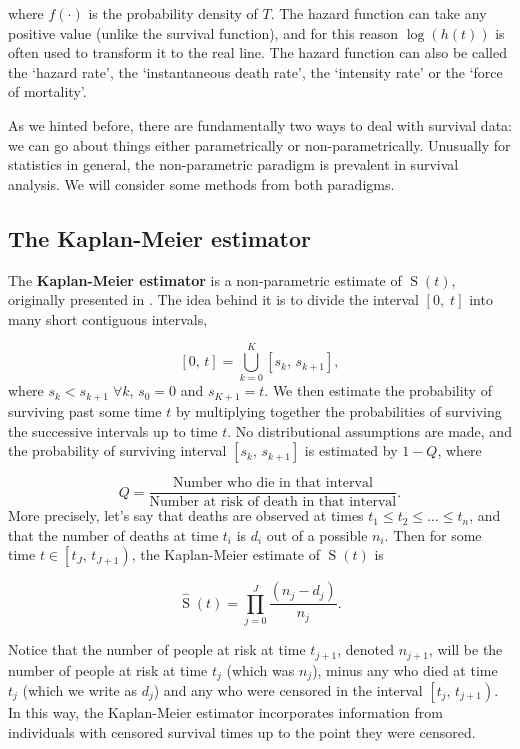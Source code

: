 \documentclass[
  openany]{book}
\theoremstyle{definition}
\theoremstyle{definition}
\theoremstyle{definition}
\theoremstyle{definition}
\theoremstyle{remark}
\begin{document}
where \(f\left(\cdot\right)\) is the probability density of \(T\). The hazard function can take any positive value (unlike the survival function), and for this reason \(\log\left(h\left(t\right)\right)\) is often used to transform it to the real line. The hazard function can also be called the `hazard rate', the `instantaneous death rate', the `intensity rate' or the `force of mortality'.

As we hinted before, there are fundamentally two ways to deal with survival data: we can go about things either parametrically or non-parametrically. Unusually for statistics in general, the non-parametric paradigm is prevalent in survival analysis. We will consider some methods from both paradigms.

\subsection{The Kaplan-Meier estimator}\label{the-kaplan-meier-estimator}

The \textbf{Kaplan-Meier estimator} is a non-parametric estimate of \(\operatorname{S}\left(t\right)\), originally presented in \citet{kaplan1958nonparametric}. The idea behind it is to divide the interval \(\left[0,\;t\right]\) into many short contiguous intervals,

\[\left[0,\,t\right] = \bigcup\limits_{k=0}^K \left[s_k,\,s_{k+1}\right],\]
where \(s_k<s_{k+1}\;\forall{k}\), \(s_0=0\) and \(s_{K+1}=t\). We then estimate the probability of surviving past some time \(t\) by multiplying together the probabilities of surviving the successive intervals up to time \(t\). No distributional assumptions are made, and the probability of surviving interval \(\left[s_k,\,s_{k+1}\right]\) is estimated by \(1-Q\), where

\[Q = \frac{\text{Number who die in that interval}}{\text{Number at risk of death in that interval}}.\]
More precisely, let's say that deaths are observed at times \(t_1\leq t_2\leq \ldots \leq t_n\), and that the number of deaths at time \(t_i\) is \(d_i\) out of a possible \(n_i\). Then for some time \(t\in\left[t_J,\,t_{J+1}\right)\), the Kaplan-Meier estimate of \(\operatorname{S}\left(t\right)\) is

\[\hat{\operatorname{S}}\left(t\right) = \prod\limits_{j=0}^J \frac{\left(n_j - d_j\right)}{n_j}.\]

Notice that the number of people at risk at time \(t_{j+1}\), denoted \(n_{j+1}\), will be the number of people at risk at time \(t_j\) (which was \(n_j\)), minus any who died at time \(t_j\) (which we write as \(d_j\)) and any who were censored in the interval \(\left[t_j,\,t_{j+1}\right)\). In this way, the Kaplan-Meier estimator incorporates information from individuals with censored survival times up to the point they were censored.
\end{document}
